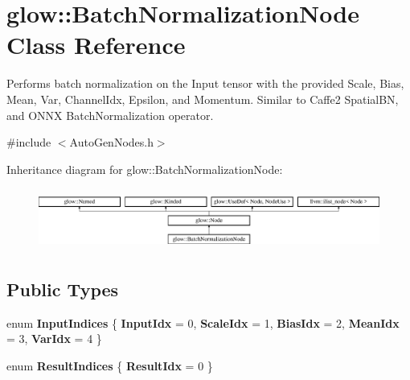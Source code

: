 \hypertarget{classglow_1_1_batch_normalization_node}{}\section{glow\+:\+:Batch\+Normalization\+Node Class Reference}
\label{classglow_1_1_batch_normalization_node}


Performs batch normalization on the Input tensor with the provided Scale, Bias, Mean, Var, Channel\+Idx, Epsilon, and Momentum. Similar to Caffe2 Spatial\+BN, and O\+N\+NX Batch\+Normalization operator.  




{\ttfamily \#include $<$Auto\+Gen\+Nodes.\+h$>$}

Inheritance diagram for glow\+:\+:Batch\+Normalization\+Node\+:\begin{figure}[H]
\begin{center}
\leavevmode
\includegraphics[height=2.028986cm]{classglow_1_1_batch_normalization_node}
\end{center}
\end{figure}
\subsection*{Public Types}
\begin{DoxyCompactItemize}
\item 
\mbox{\label{classglow_1_1_batch_normalization_node_a14c97cbd17d597bf6cf8dd8d180f712b}} 
enum {\bfseries Input\+Indices} \{ \newline
{\bfseries Input\+Idx} = 0, 
{\bfseries Scale\+Idx} = 1, 
{\bfseries Bias\+Idx} = 2, 
{\bfseries Mean\+Idx} = 3, 
\newline
{\bfseries Var\+Idx} = 4
 \}
\item 
\mbox{\label{classglow_1_1_batch_normalization_node_a22373734cc145e7b1673c8d856be3542}} 
enum {\bfseries Result\+Indices} \{ {\bfseries Result\+Idx} = 0
 \}
\end{DoxyCompactItemize}
